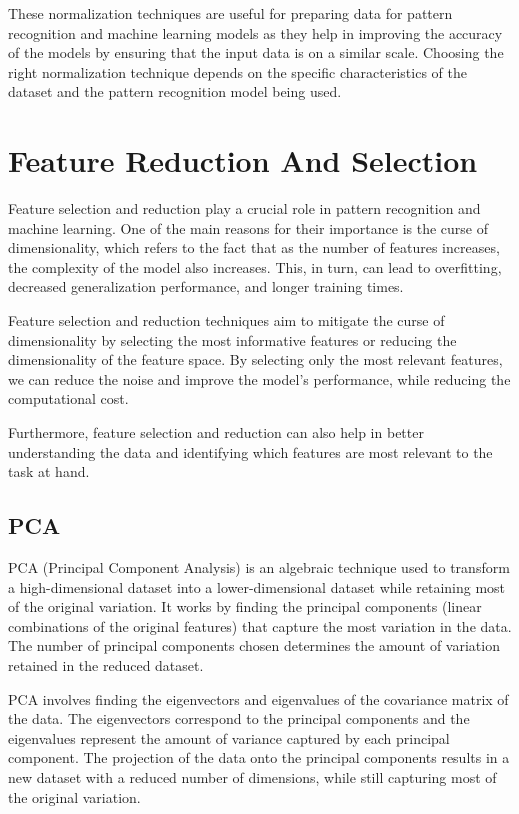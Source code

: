 \documentclass[12pt, a4paper]{article}
\begin{document}
These normalization techniques are useful for preparing data for pattern recognition and machine learning models as they help in improving the accuracy of the models by ensuring that the input data is on a similar scale. Choosing the right normalization technique depends on the specific characteristics of the dataset and the pattern recognition model being used.

\section{Feature Reduction And Selection}
Feature selection and reduction play a crucial role in pattern recognition and machine learning. One of the main reasons for their importance is the curse of dimensionality, which refers to the fact that as the number of features increases, the complexity of the model also increases. This, in turn, can lead to overfitting, decreased generalization performance, and longer training times.

Feature selection and reduction techniques aim to mitigate the curse of dimensionality by selecting the most informative features or reducing the dimensionality of the feature space. By selecting only the most relevant features, we can reduce the noise and improve the model's performance, while reducing the computational cost.

Furthermore, feature selection and reduction can also help in better understanding the data and identifying which features are most relevant to the task at hand.

\subsection{PCA}

PCA (Principal Component Analysis) is an algebraic technique used to transform a high-dimensional dataset into a lower-dimensional dataset while retaining most of the original variation. It works by finding the principal components (linear combinations of the original features) that capture the most variation in the data. The number of principal components chosen determines the amount of variation retained in the reduced dataset.

PCA involves finding the eigenvectors and eigenvalues of the covariance matrix of the data. The eigenvectors correspond to the principal components and the eigenvalues represent the amount of variance captured by each principal component. The projection of the data onto the principal components results in a new dataset with a reduced number of dimensions, while still capturing most of the original variation.
\end{document}
